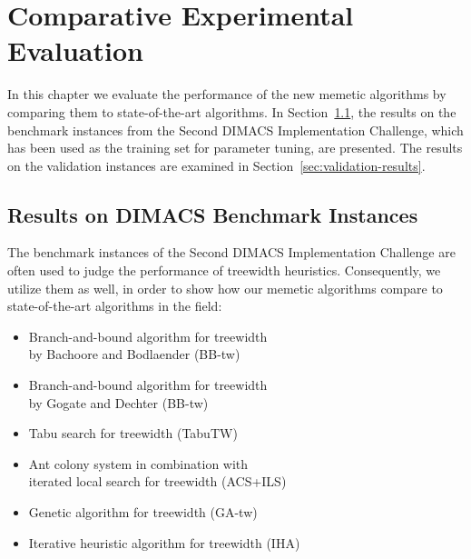 \documentclass[thesis.tex]{subfiles}
\begin{document}
\chapter{Comparative Experimental Evaluation}
\label{ch:Results}

In this chapter we evaluate the performance of the new memetic algorithms by comparing them to state-of-the-art algorithms. In Section~\ref{sec:dimacs-results}, the results on the benchmark instances from the Second \gls{DIMACS} Implementation Challenge, which has been used as the training set for parameter tuning, are presented. The results on the validation instances are examined in Section~\ref{sec:validation-results}.


\section{Results on DIMACS Benchmark Instances}
   \label{sec:dimacs-results}
%
   The benchmark instances of the Second \gls{DIMACS} Implementation Challenge are often used to judge the performance of treewidth heuristics. Consequently, we utilize them as well, in order to show how our memetic algorithms compare to state-of-the-art algorithms in the field:%
\begin{raggedright}
   \begin{itemize}\itemsep1ex
         \item Branch-and-bound algorithm for treewidth\\ by Bachoore and Bodlaender (BB-tw)~\parencite{bachoore-bodlaender-2006-branchAndBound}
         \item Branch-and-bound algorithm for treewidth\\ by Gogate and Dechter (BB-tw)~\parencite{gogate-2004-quickbb}
         \item Tabu search for treewidth (TabuTW)~\parencite{clautiaux-2004-tabu}
         \item Ant colony system in combination with\\ iterated local search for treewidth (ACS+ILS)~\parencite{hammerl-thesis,hammerl-paper}
         \item Genetic algorithm for treewidth (GA-tw)~\parencite{schafhauser-thesis,schafhauser-paper}
         \item Iterative heuristic algorithm for treewidth (IHA)~\parencite{musliu-2008-ILS}
   \end{itemize}
\end{raggedright}
   
\end{document}
